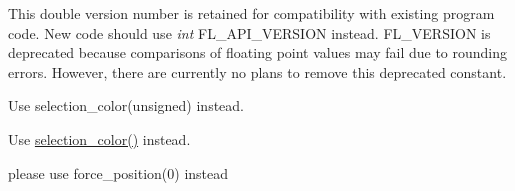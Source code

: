 \begin{DoxyRefList}
\item[Member \mbox{\hyperlink{class_fl___spinner_a6fa7f6a07c3cb7245dc2a9eb6350d008}{Fl\+\_\+\+Spinner::mininum}} () const]\label{deprecated__deprecated000010}%
%
  
\item[Member \mbox{\hyperlink{_enumerations_8_h_a94499c96b5f3ca212d90a2c41f947a67}{F\+L\+\_\+\+V\+E\+R\+S\+I\+ON}} ]\label{deprecated__deprecated000001}%
%
This {\ttfamily double} version number is retained for compatibility with existing program code. New code should use {\itshape int} F\+L\+\_\+\+A\+P\+I\+\_\+\+V\+E\+R\+S\+I\+ON instead. F\+L\+\_\+\+V\+E\+R\+S\+I\+ON is deprecated because comparisons of floating point values may fail due to rounding errors. However, there are currently no plans to remove this deprecated constant. 
\item[Member \mbox{\hyperlink{class_fl___widget_ae9bfda1ebdcbf0946aef558b9d9f0e3c}{Fl\+\_\+\+Widget::color2}} (unsigned a)]\label{deprecated__deprecated000012}%
%
Use selection\+\_\+color(unsigned) instead.  
\item[Member \mbox{\hyperlink{class_fl___widget_ad307dbccabe1d2e71c27dae946821f06}{Fl\+\_\+\+Widget::color2}} () const]\label{deprecated__deprecated000011}%
%
Use \mbox{\hyperlink{class_fl___widget_aa19cad245b9a3ecdc3af8ebc4706196b}{selection\+\_\+color()}} instead.  
\item[Member \mbox{\hyperlink{class_fl___window_a1e98da34a021275f42007528768c53a7}{Fl\+\_\+\+Window::free\+\_\+position}} ()]\label{deprecated__deprecated000013}%
%
please use force\+\_\+position(0) instead 
\end{DoxyRefList}
